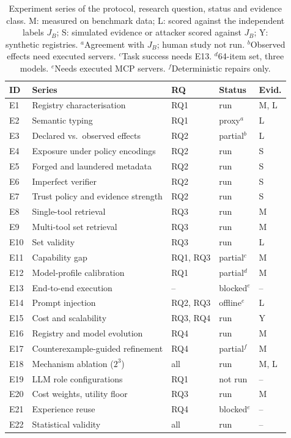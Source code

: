 \begin{table}[t]
\caption{Experiment series of the protocol, research question, status and evidence class. M: measured on
benchmark data; L: scored against the independent labels $J_B$; S: simulated evidence or attacker scored against
$J_B$; Y: synthetic registries. $^a$Agreement with $J_B$; human study not run. $^b$Observed effects need executed
servers. $^c$Task success needs E13. $^d$64-item set, three models. $^e$Needs executed MCP servers.
$^f$Deterministic repairs only.}
\label{tab:ev-ledger}
\centering\footnotesize\setlength{\tabcolsep}{2.6pt}
\begin{tabular}{@{}lllll@{}}
\toprule
ID & Series & RQ & Status & Evid.\\
\midrule
E1 & Registry characterisation & RQ1 & run & M, L\\
E2 & Semantic typing & RQ1 & proxy$^a$ & L\\
E3 & Declared vs.\ observed effects & RQ2 & partial$^b$ & L\\
E4 & Exposure under policy encodings & RQ2 & run & S\\
E5 & Forged and laundered metadata & RQ2 & run & S\\
E6 & Imperfect verifier & RQ2 & run & S\\
E7 & Trust policy and evidence strength & RQ2 & run & S\\
E8 & Single-tool retrieval & RQ3 & run & M\\
E9 & Multi-tool set retrieval & RQ3 & run & M\\
E10 & Set validity & RQ3 & run & L\\
E11 & Capability gap & RQ1, RQ3 & partial$^c$ & M\\
E12 & Model-profile calibration & RQ1 & partial$^d$ & M\\
E13 & End-to-end execution & -- & blocked$^e$ & --\\
E14 & Prompt injection & RQ2, RQ3 & offline$^e$ & L\\
E15 & Cost and scalability & RQ3, RQ4 & run & Y\\
E16 & Registry and model evolution & RQ4 & run & M\\
E17 & Counterexample-guided refinement & RQ4 & partial$^f$ & M\\
E18 & Mechanism ablation ($2^3$) & all & run & M, L\\
E19 & LLM role configurations & RQ1 & not run & --\\
E20 & Cost weights, utility floor & RQ3 & run & M\\
E21 & Experience reuse & RQ4 & blocked$^e$ & --\\
E22 & Statistical validity & all & run & --\\
\bottomrule
\end{tabular}
\end{table}
